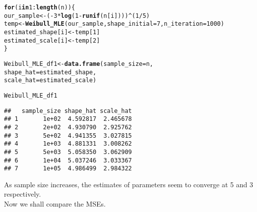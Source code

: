 \documentclass[11pt, a4paper]{article}\usepackage[]{graphicx}\usepackage[]{xcolor}
\makeatletter
\newcommand{\hlnum}[1]{\textcolor[rgb]{0.686,0.059,0.569}{#1}}%
\newcommand{\hlopt}[1]{\textcolor[rgb]{0,0,0}{#1}}%
\newcommand{\hldef}[1]{\textcolor[rgb]{0.345,0.345,0.345}{#1}}%
\newcommand{\hlkwa}[1]{\textcolor[rgb]{0.161,0.373,0.58}{\textbf{#1}}}%
\newcommand{\hlkwb}[1]{\textcolor[rgb]{0.69,0.353,0.396}{#1}}%
\newcommand{\hlkwc}[1]{\textcolor[rgb]{0.333,0.667,0.333}{#1}}%
\newcommand{\hlkwd}[1]{\textcolor[rgb]{0.737,0.353,0.396}{\textbf{#1}}}%
\newenvironment{kframe}{%
 \def\at@end@of@kframe{}%
 \ifinner\ifhmode%
  \def\at@end@of@kframe{\end{minipage}}%
  \begin{minipage}{\columnwidth}%
 \fi\fi%
 \def\FrameCommand##1{\hskip\@totalleftmargin \hskip-\fboxsep
 \colorbox{shadecolor}{##1}\hskip-\fboxsep
     \hskip-\linewidth \hskip-\@totalleftmargin \hskip\columnwidth}%
 \MakeFramed {\advance\hsize-\width
   \@totalleftmargin\z@ \linewidth\hsize
   \@setminipage}}%
 {\par\unskip\endMakeFramed%
 \at@end@of@kframe}
\newenvironment{knitrout}{}{} %
\makeatother
\begin{document}
\begin{knitrout}
\color{fgcolor}\begin{kframe}
\begin{alltt}
\hlkwa{for} \hldef{(i} \hlkwa{in} \hlnum{1}\hlopt{:}\hlkwd{length}\hldef{(n)) \{}
  \hldef{our_sample} \hlkwb{<-} \hldef{(}\hlopt{-} \hlnum{3} \hlopt{*} \hlkwd{log}\hldef{(}\hlnum{1} \hlopt{-} \hlkwd{runif}\hldef{(n[i])))}\hlopt{^}\hldef{(}\hlnum{1}\hlopt{/}\hlnum{5}\hldef{)}
  \hldef{temp} \hlkwb{<-} \hlkwd{Weibull_MLE}\hldef{(our_sample,} \hlkwc{shape_initial} \hldef{=} \hlnum{7}\hldef{,} \hlkwc{n_iteration} \hldef{=} \hlnum{1000}\hldef{)}
  \hldef{estimated_shape[i]} \hlkwb{<-} \hldef{temp[}\hlnum{1}\hldef{]}
  \hldef{estimated_scale[i]} \hlkwb{<-} \hldef{temp[}\hlnum{2}\hldef{]}
\hldef{\}}
\end{alltt}
\end{kframe}
\end{knitrout}

\begin{knitrout}
\color{fgcolor}\begin{kframe}
\begin{alltt}
\hldef{Weibull_MLE_df1} \hlkwb{<-} \hlkwd{data.frame}\hldef{(}\hlkwc{sample_size} \hldef{= n,}
                            \hlkwc{shape_hat} \hldef{= estimated_shape,}
                            \hlkwc{scale_hat} \hldef{= estimated_scale)}
\end{alltt}
\end{kframe}
\end{knitrout}

\begin{knitrout}
\color{fgcolor}\begin{kframe}
\begin{alltt}
\hldef{Weibull_MLE_df1}
\end{alltt}
\begin{verbatim}
##   sample_size shape_hat scale_hat
## 1       1e+02  4.592817  2.465678
## 2       2e+02  4.930790  2.925762
## 3       5e+02  4.941355  3.027815
## 4       1e+03  4.881331  3.008262
## 5       5e+03  5.058350  3.062909
## 6       1e+04  5.037246  3.033367
## 7       1e+05  4.986499  2.984322
\end{verbatim}
\end{kframe}
\end{knitrout}

\smallpencil \hspace{0.1cm} {\setlength{\spaceskip}{1em plus 0.5em minus 0.5em} \fontsize{17}{20}\myfont As sample size increases, the estimates of parameters seem to converge at 5 and 3 respectively. \\

Now we shall compare the MSEs.
\par}
\end{document}
